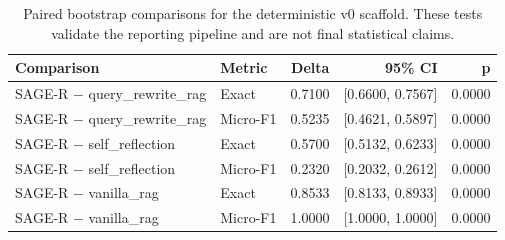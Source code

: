 \begin{table}[t]
\centering
\scriptsize
\setlength{\tabcolsep}{3pt}
\begin{tabular}{llrrr}
\toprule
Comparison & Metric & Delta & 95\% CI & p \\
\midrule
SAGE-R $-$ query\_rewrite\_rag & Exact & 0.7100 & [0.6600, 0.7567] & 0.0000 \\
SAGE-R $-$ query\_rewrite\_rag & Micro-F1 & 0.5235 & [0.4621, 0.5897] & 0.0000 \\
SAGE-R $-$ self\_reflection & Exact & 0.5700 & [0.5132, 0.6233] & 0.0000 \\
SAGE-R $-$ self\_reflection & Micro-F1 & 0.2320 & [0.2032, 0.2612] & 0.0000 \\
SAGE-R $-$ vanilla\_rag & Exact & 0.8533 & [0.8133, 0.8933] & 0.0000 \\
SAGE-R $-$ vanilla\_rag & Micro-F1 & 1.0000 & [1.0000, 1.0000] & 0.0000 \\
\bottomrule
\end{tabular}
\caption{Paired bootstrap comparisons for the deterministic v0 scaffold. These tests validate the reporting pipeline and are not final statistical claims.}
\label{tab:v0-stats}
\end{table}
